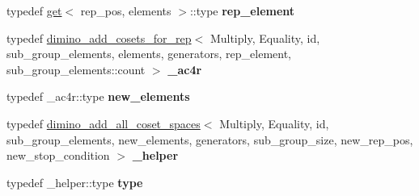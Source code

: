 \begin{DoxyCompactItemize}
\item 
\mbox{\label{struct_eigen_1_1internal_1_1group__theory_1_1dimino__add__all__coset__spaces_aa5f76c188f2a5cc5c5d165dd95862ed6}} 
typedef \hyperlink{struct_eigen_1_1internal_1_1get}{get}$<$ rep\+\_\+pos, elements $>$\+::type {\bfseries rep\+\_\+element}
\item 
\mbox{\label{struct_eigen_1_1internal_1_1group__theory_1_1dimino__add__all__coset__spaces_ad4f264915b6d925e40aa978cd2be7567}} 
typedef \hyperlink{struct_eigen_1_1internal_1_1group__theory_1_1dimino__add__cosets__for__rep}{dimino\+\_\+add\+\_\+cosets\+\_\+for\+\_\+rep}$<$ Multiply, Equality, id, sub\+\_\+group\+\_\+elements, elements, generators, rep\+\_\+element, sub\+\_\+group\+\_\+elements\+::count $>$ {\bfseries \+\_\+ac4r}
\item 
\mbox{\label{struct_eigen_1_1internal_1_1group__theory_1_1dimino__add__all__coset__spaces_af0fa4e28d09354873ed510ad7b4740dd}} 
typedef \+\_\+ac4r\+::type {\bfseries new\+\_\+elements}
\item 
\mbox{\label{struct_eigen_1_1internal_1_1group__theory_1_1dimino__add__all__coset__spaces_af5fa0b2b68ccfaa023d6113753a986df}} 
typedef \hyperlink{struct_eigen_1_1internal_1_1group__theory_1_1dimino__add__all__coset__spaces}{dimino\+\_\+add\+\_\+all\+\_\+coset\+\_\+spaces}$<$ Multiply, Equality, id, sub\+\_\+group\+\_\+elements, new\+\_\+elements, generators, sub\+\_\+group\+\_\+size, new\+\_\+rep\+\_\+pos, new\+\_\+stop\+\_\+condition $>$ {\bfseries \+\_\+helper}
\item 
\mbox{\label{struct_eigen_1_1internal_1_1group__theory_1_1dimino__add__all__coset__spaces_a75320f83307a37a34ab998b899c0af2c}} 
typedef \+\_\+helper\+::type {\bfseries type}
\end{DoxyCompactItemize}
